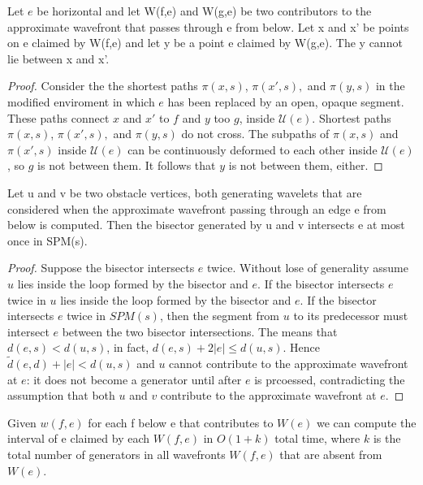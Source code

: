 \begin{Lemma}[Lemma 4.4] 
	Let $e$ be horizontal  and let W(f,e) and W(g,e) be two contributors to the
	approximate wavefront that passes through e from below. Let x and x' be
	points on e claimed by W(f,e) and let y be a point e claimed by W(g,e). The
	y cannot lie between x and x'.
\end{Lemma}
\begin{proof}
	Consider the the shortest paths $\pi(x,s)$, $\pi(x',s),$ and $\pi(y,s)$ in
	the modified enviroment in which $e$ has been replaced by an open, opaque
	segment. These paths connect $x$ and $x'$ to $f$ and $y$ too $g$, inside
	$\mathcal{U}(e)$. Shortest paths $\pi(x,s)$, $\pi(x',s),$ and $\pi(y,s)$ do
	not cross. The subpaths of $\pi(x,s)$ and $\pi(x',s)$ inside
	$\mathcal{U}(e)$ can be continuously deformed to each other inside
	$\mathcal{U}(e)$, so $g$ is not between them. It follows that $y$ is not
	between them, either.
\end{proof}
\begin{Lemma}[Lemma 4.5]
	Let u and v be two obstacle vertices, both generating wavelets that are
	considered when the approximate wavefront passing through an edge e from
	below is computed. Then the bisector generated by u and v intersects e at
	most once in SPM(s).
\end{Lemma}
\begin{proof}
	Suppose the bisector intersects $e$ twice. Without lose of generality assume
	$u$ lies inside the loop formed by the bisector and $e$. If the bisector
	intersects $e$ twice in $u$ lies inside the loop formed by the bisector and
	$e$. If the bisector intersects $e$ twice in $SPM(s)$, then the segment from
	$u$ to its predecessor must intersect $e$ between the two bisector
	intersections.  The means that $d(e,s)<d(u,s)$, in fact, $d(e,s)+2|e|\leq
	d(u,s)$. Hence $\tilde{d}(e,d)+|e| < d(u,s)$ and $u$ cannot contribute to
	the approximate wavefront at $e$: it does not become a generator until after
	$e$ is prcoessed, contradicting the assumption that both $u$ and $v$
	contribute to the approximate wavefront at $e$.
\end{proof}

\begin{Lemma}[Lemma 4.6] \label{lemma:4.6HersherbergerS99}
	Given $w(f,e)$	for each f below e that contributes to $W(e)$ we can compute
	the interval of e claimed by each $W(f,e)$ in $O(1+k)$ total time, where $k$
	is the total number of generators in all wavefronts $W(f,e)$ that are absent
	from $W(e)$.
\end{Lemma}

